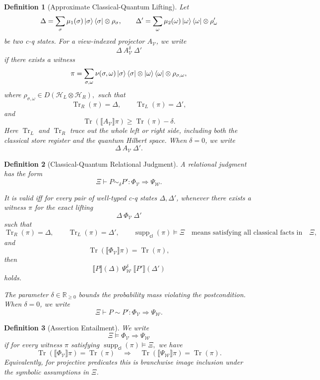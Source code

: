 \documentclass[acmsmall,screen,review,anonymous,nonacm]{acmart}
\newtheorem{definition}{Definition}[section]
\theoremstyle{defn_style}
\begin{document}
\begin{definition}[Approximate Classical-Quantum Lifting]
Let
\[
\Delta
=
\sum_{\sigma}
\mu_1(\sigma)\ket{\sigma}\bra{\sigma}\otimes\rho_\sigma,
\qquad
\Delta'
=
\sum_{\omega}
\mu_2(\omega)\ket{\omega}\bra{\omega}\otimes\rho'_\omega
\]
be two c-q states. For a view-indexed projector \(A_{\mathcal V}\), we write
\[
\Delta\ A_{\mathcal V}^{\delta}\ \Delta'
\]
if there exists a witness
\[
\pi
=
\sum_{\sigma,\omega}
\nu(\sigma,\omega)
\ket{\sigma}\bra{\sigma}
\otimes
\ket{\omega}\bra{\omega}
\otimes
\rho_{\sigma,\omega},
\]
where
\(\rho_{\sigma,\omega}\in
D(\mathcal H_L\otimes\mathcal H_R),\)
such that
\[
\operatorname{Tr}_R(\pi)=\Delta,
\qquad
\operatorname{Tr}_L(\pi)=\Delta',
\]
and
\[
\operatorname{Tr}
\left(
\llbracket A_{\mathcal V}\rrbracket\pi
\right)
\ge
\operatorname{Tr}(\pi)-\delta.
\]
Here \(\operatorname{Tr}_L\) and \(\operatorname{Tr}_R\) trace out the whole left
or right side, including both the classical store register and the quantum
Hilbert space. When \(\delta=0\), we write
\[
\Delta\ A_{\mathcal V}\ \Delta'.
\]
\end{definition}

\begin{definition}[Classical-Quantum Relational Judgment]
A relational judgment has the form
\[
\Xi
\vdash
P\sim_{\delta}P'
:
\Phi_{\mathcal V}
\Longrightarrow
\Psi_{\mathcal W}.
\]



It is valid iff for every pair of well-typed c-q states
\(\Delta,\Delta'\), whenever there exists a witness \(\pi\) for the exact
lifting
\[
\Delta\ \Phi_{\mathcal V}\ \Delta'
\]
such that
\[
\operatorname{Tr}_R(\pi)=\Delta,
\qquad
\operatorname{Tr}_L(\pi)=\Delta',
\qquad
\operatorname{supp}_{\mathsf{cl}}(\pi)\models\Xi\quad\text{means satisfying all classical facts in} \quad\Xi,
\]
and
\[
\operatorname{Tr}
\left(
\llbracket \Phi_{\mathcal V}\rrbracket\pi
\right)
=
\operatorname{Tr}(\pi),
\]
then
\[
\llbracket P\rrbracket(\Delta)
\ \Psi_{\mathcal W}^{\delta}\
\llbracket P'\rrbracket(\Delta')
\]
holds.

The parameter \(\delta\in\mathbb R_{\ge 0}\) bounds the probability mass
violating the postcondition. When \(\delta=0\), we write
\[
\Xi
\vdash
P\sim P'
:
\Phi_{\mathcal V}
\Longrightarrow
\Psi_{\mathcal W}.
\]
\end{definition}


\begin{definition}[Assertion Entailment]
We write
\[
\Xi
\vDash
\Phi_{\mathcal V}
\Longrightarrow
\Psi_{\mathcal W}
\]
if for every witness \(\pi\) satisfying
\({\operatorname{supp}_{\mathsf{cl}}(\pi)\models\Xi},\)
we have
\[
\operatorname{Tr}
\left(
\llbracket\Phi_{\mathcal V}\rrbracket\pi
\right)
=
\operatorname{Tr}(\pi)
\quad\Longrightarrow\quad
\operatorname{Tr}
\left(
\llbracket\Psi_{\mathcal W}\rrbracket\pi
\right)
=
\operatorname{Tr}(\pi).
\]
Equivalently, for projective predicates this is branchwise image inclusion
under the symbolic assumptions in \(\Xi\).
\end{definition}
\end{document}
